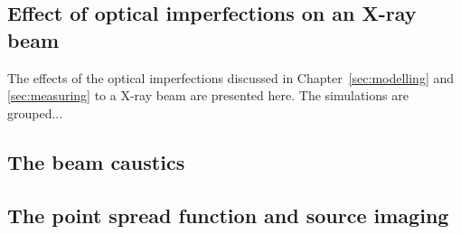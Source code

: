 \begin{refsection}
\chapter{Effect of optical imperfections on an X-ray beam}
\label{sec:effect_optical_imperfections}

The effects of the optical imperfections discussed in Chapter~\ref{sec:modelling} and \ref{sec:measuring} to a X-ray beam are presented here. The simulations are grouped...

\section{The beam caustics}




\section{The point spread function and source imaging}


\end{refsection}
